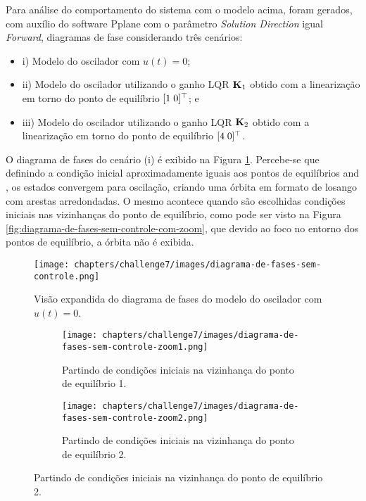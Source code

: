 Para análise do comportamento do sistema com o modelo acima, foram gerados, com
auxílio do software Pplane com o parâmetro \textit{Solution Direction} igual
\textit{Forward}, diagramas de fase considerando três cenários:

\begin{itemize}
    \item i) Modelo do oscilador com $u(t) = 0$;
    \item ii) Modelo do oscilador utilizando o ganho LQR $\mat{K}_1$ obtido com
    a linearização em torno do ponto de equilíbrio $[1 \thickspace 0]^\top$; e
    \item iii) Modelo do oscilador utilizando o ganho LQR $\mat{K}_2$ obtido com
    a linearização em torno do ponto de equilíbrio $[4 \thickspace 0]^\top$.
\end{itemize}

O diagrama de fases do cenário (i) é exibido na Figura
\ref{fig:diagrama-de-fases-sem-controle}. Percebe-se que definindo a condição
inicial aproximadamente iguais aos pontos de equilíbrios \peqone and \peqtwo, os
estados convergem para oscilação, criando uma órbita em formato de losango com
arestas arredondadas. O mesmo acontece quando são escolhidas condições iniciais
nas vizinhanças do ponto de equilíbrio, como pode ser visto na Figura
\ref{fig:diagrama-de-fases-sem-controle-com-zoom}, que devido ao foco no entorno
dos pontos de equilíbrio, a órbita não é exibida.

\begin{figure}[H]
    \caption{Visão expandida do diagrama de fases do modelo do oscilador com $u(t) = 0$.}
    \label{fig:diagrama-de-fases-sem-controle}
    \centering
    \texttt{[image: chapters/challenge7/images/diagrama-de-fases-sem-controle.png]}
\end{figure}

\begin{figure}[H]
    \caption{Visão delimitada do diagrama de fases do modelo do oscilador com $u(t) = 0$.}
    \label{fig:diagrama-de-fases-sem-controle-com-zoom}
    \centering
    \begin{subfigure}[t]{0.48\textwidth}
        \centering
	    \texttt{[image: chapters/challenge7/images/diagrama-de-fases-sem-controle-zoom1.png]}
        \caption{Partindo de condições iniciais na vizinhança do ponto de equilíbrio 1.}
        \label{fig:diagrama-de-fases-sem-controle-ponto-de-equilibrio-1}
    \end{subfigure}
    \hfill
    \begin{subfigure}[t]{0.48\textwidth}
        \centering
	    \texttt{[image: chapters/challenge7/images/diagrama-de-fases-sem-controle-zoom2.png]}
        \caption{Partindo de condições iniciais na vizinhança do ponto de equilíbrio 2.}
        \label{fig:diagrama-de-fases-sem-controle-ponto-de-equilibrio-2}
    \end{subfigure}
\end{figure}

